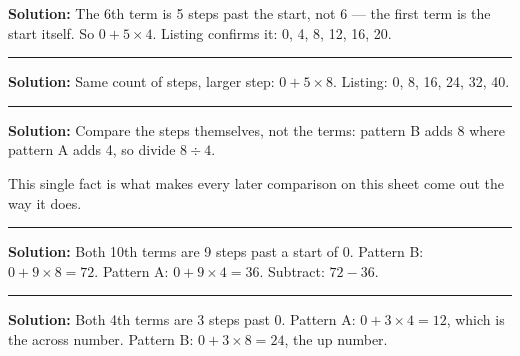 \documentclass[12pt]{article}
\begin{document}




\textbf{Solution:} The 6th term is 5 steps past the start, not 6 --- the first term is the start itself. So $0 + 5 \times 4$. Listing confirms it: 0, 4, 8, 12, 16, 20. 

\vspace{0.15cm}\noindent\rule{\linewidth}{0.2pt}\vspace{0.15cm}


\textbf{Solution:} Same count of steps, larger step: $0 + 5 \times 8$. Listing: 0, 8, 16, 24, 32, 40. 

\vspace{0.15cm}\noindent\rule{\linewidth}{0.2pt}\vspace{0.15cm}


\textbf{Solution:} Compare the steps themselves, not the terms: pattern B adds 8 where pattern A adds 4, so divide $8 \div 4$. 

This single fact is what makes every later comparison on this sheet come out the way it does.

\vspace{0.15cm}\noindent\rule{\linewidth}{0.2pt}\vspace{0.15cm}


\textbf{Solution:} Both 10th terms are 9 steps past a start of 0. Pattern B: $0 + 9 \times 8 = 72$. Pattern A: $0 + 9 \times 4 = 36$. Subtract: $72 - 36$. 

\vspace{0.15cm}\noindent\rule{\linewidth}{0.2pt}\vspace{0.15cm}


\textbf{Solution:} Both 4th terms are 3 steps past 0. Pattern A: $0 + 3 \times 4 = 12$, which is the across number. Pattern B: $0 + 3 \times 8 = 24$, the up number. 
\end{document}
